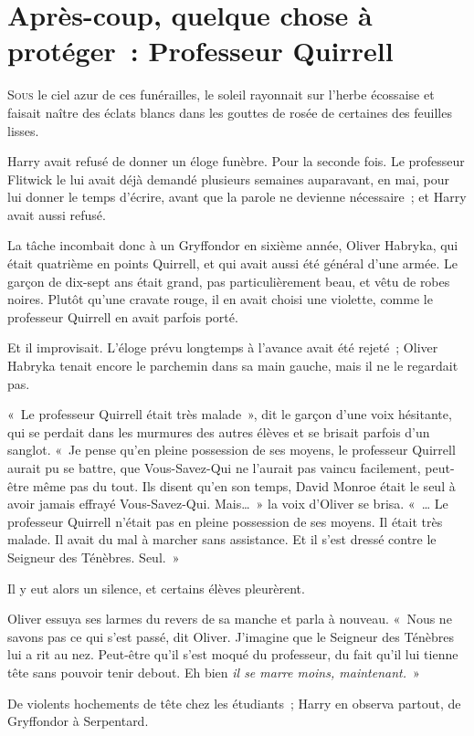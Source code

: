 \chapter{Après-coup, quelque chose à protéger~: Professeur Quirrell}

\lettrine{S}{ous} le ciel azur de ces funérailles, le soleil rayonnait sur l'herbe écossaise et faisait naître des éclats blancs dans les gouttes de rosée de certaines des feuilles lisses.

Harry avait refusé de donner un éloge funèbre. Pour la seconde fois. Le professeur Flitwick le lui avait déjà demandé plusieurs semaines auparavant, en mai, pour lui donner le temps d'écrire, avant que la parole ne devienne nécessaire~; et Harry avait aussi refusé.

La tâche incombait donc à un Gryffondor en sixième année, Oliver Habryka, qui était quatrième en points Quirrell, et qui avait aussi été général d'une armée. Le garçon de dix-sept ans était grand, pas particulièrement beau, et vêtu de robes noires. Plutôt qu'une cravate rouge, il en avait choisi une violette, comme le professeur Quirrell en avait parfois porté.

Et il improvisait. L'éloge prévu longtemps à l'avance avait été rejeté~; Oliver Habryka tenait encore le parchemin dans sa main gauche, mais il ne le regardait pas.

«~Le professeur Quirrell était très malade~», dit le garçon d'une voix hésitante, qui se perdait dans les murmures des autres élèves et se brisait parfois d'un sanglot. «~Je pense qu'en pleine possession de ses moyens, le professeur Quirrell aurait pu se battre, que Vous-Savez-Qui ne l'aurait pas vaincu facilement, peut-être même pas du tout. Ils disent qu'en son temps, David Monroe était le seul à avoir jamais effrayé Vous-Savez-Qui. Mais…~» la voix d'Oliver se brisa. «~… Le professeur Quirrell n'était pas en pleine possession de ses moyens. Il était très malade. Il avait du mal à marcher sans assistance. Et il s'est dressé contre le Seigneur des Ténèbres. Seul.~»

Il y eut alors un silence, et certains élèves pleurèrent.

Oliver essuya ses larmes du revers de sa manche et parla à nouveau. «~Nous ne savons pas ce qui s'est passé, dit Oliver. J'imagine que le Seigneur des Ténèbres lui a rit au nez. Peut-être qu'il s'est moqué du professeur, du fait qu'il lui tienne tête sans pouvoir tenir debout. Eh bien \emph{il se marre moins, maintenant.}~»

De violents hochements de tête chez les étudiants~; Harry en observa partout, de Gryffondor à Serpentard.

